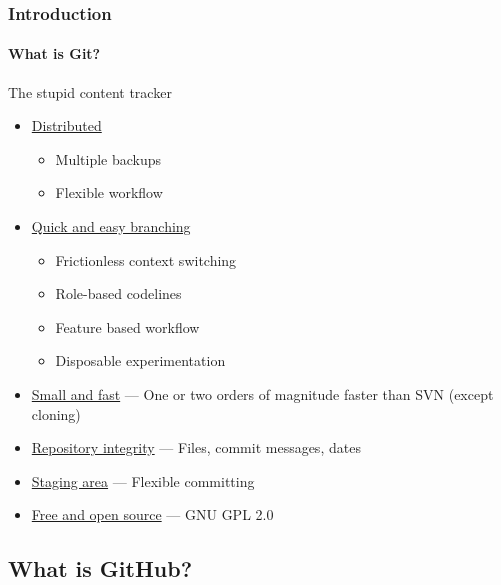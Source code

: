 \documentclass{beamer}
\begin{document}
\begin{frame}
 \frametitle{Introduction}
 \framesubtitle{What is Git?}

 The stupid content tracker\footnotemark
 \begin{itemize}
  \item \href{http://git-scm.com/about/distributed}{Distributed}
   \begin{itemize}
    \item Multiple backups
    \item Flexible workflow
   \end{itemize}
  \item \href{http://git-scm.com/about/branching-and-merging}{Quick and easy
        branching}
   \begin{itemize}
    \item Frictionless context switching
    \item Role-based codelines
    \item Feature based workflow
    \item Disposable experimentation
   \end{itemize}
  \item \href{http://git-scm.com/about/small-and-fast}{Small and fast}
        --- One or two orders of magnitude faster than SVN (except cloning)
  \item \href{http://git-scm.com/about/info-assurance}{Repository integrity}
        --- Files, commit messages, dates
  \item \href{http://git-scm.com/about/staging-area}{Staging area}
        --- Flexible committing
  \item \href{http://git-scm.com/about/free-and-open-source}{Free and open
        source} --- GNU GPL 2.0
 \end{itemize}

\end{frame}

\subsection{What is GitHub?}
\end{document}

